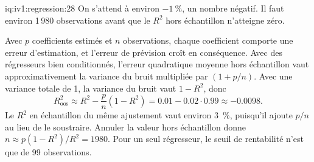 \begin{solution}{iq:iv1:regression:28}
On s'attend à environ $-1~\%$, un nombre négatif. Il faut environ 1\,980 observations avant que le $R^2$ hors échantillon n'atteigne zéro.

Avec $p$ coefficients estimés et $n$ observations, chaque coefficient comporte une erreur d'estimation, et l'erreur de prévision croît en conséquence. Avec des régresseurs bien conditionnés, l'erreur quadratique moyenne hors échantillon vaut approximativement la variance du bruit multipliée par $(1 + p/n)$. Avec une variance totale de 1, la variance du bruit vaut $1 - R^2$, donc
\[
R^2_{\text{oos}} \approx R^2 - \frac{p}{n}(1 - R^2) = 0.01 - 0.02 \cdot 0.99 \approx -0.0098 .
\]
Le $R^2$ en échantillon du même ajustement vaut environ 3~\%, puisqu'il ajoute $p/n$ au lieu de le soustraire. Annuler la valeur hors échantillon donne $n \approx p(1 - R^2)/R^2 = 1980$. Pour un seul régresseur, le seuil de rentabilité n'est que de 99 observations.

\end{solution}


